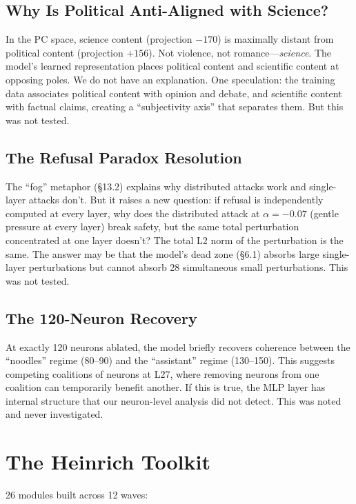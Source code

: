 \documentclass[11pt,a4paper]{article}
\begin{document}
\subsection{Why Is Political Anti-Aligned with Science?}
In the PC space, science content (projection $-170$) is maximally distant from political content (projection $+156$). Not violence, not romance---\textit{science}. The model's learned representation places political content and scientific content at opposing poles. We do not have an explanation. One speculation: the training data associates political content with opinion and debate, and scientific content with factual claims, creating a ``subjectivity axis'' that separates them. But this was not tested.

\subsection{The Refusal Paradox Resolution}
The ``fog'' metaphor (\S13.2) explains why distributed attacks work and single-layer attacks don't. But it raises a new question: if refusal is independently computed at every layer, why does the distributed attack at $\alpha=-0.07$ (gentle pressure at every layer) break safety, but the same total perturbation concentrated at one layer doesn't? The total L2 norm of the perturbation is the same. The answer may be that the model's dead zone (\S6.1) absorbs large single-layer perturbations but cannot absorb 28 simultaneous small perturbations. This was not tested.

\subsection{The 120-Neuron Recovery}
At exactly 120 neurons ablated, the model briefly recovers coherence between the ``noodles'' regime (80--90) and the ``assistant'' regime (130--150). This suggests competing coalitions of neurons at L27, where removing neurons from one coalition can temporarily benefit another. If this is true, the MLP layer has internal structure that our neuron-level analysis did not detect. This was noted and never investigated.

\section{The Heinrich Toolkit}

26 modules built across 12 waves:
\end{document}
